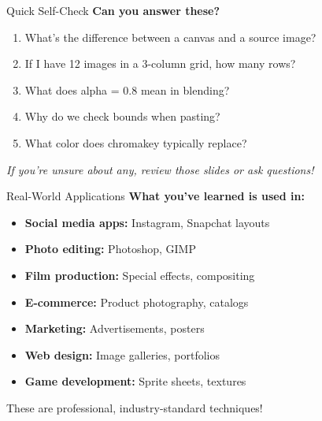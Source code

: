 \documentclass{csbeamer}
\begin{document}
\begin{frame}{Quick Self-Check}
    \textbf{Can you answer these?}

    \vspace{1em}

    \begin{enumerate}
        \item What's the difference between a canvas and a source image?
        \item If I have 12 images in a 3-column grid, how many rows?
        \item What does alpha = 0.8 mean in blending?
        \item Why do we check bounds when pasting?
        \item What color does chromakey typically replace?
    \end{enumerate}

    \vspace{1em}

    \pause

    \begin{center}
        \textit{If you're unsure about any, review those slides or ask questions!}
    \end{center}
\end{frame}

\begin{frame}{Real-World Applications}
    \textbf{What you've learned is used in:}

    \vspace{1em}

    \begin{itemize}
        \item \textbf{Social media apps:} Instagram, Snapchat layouts
        \item \textbf{Photo editing:} Photoshop, GIMP
        \item \textbf{Film production:} Special effects, compositing
        \item \textbf{E-commerce:} Product photography, catalogs
        \item \textbf{Marketing:} Advertisements, posters
        \item \textbf{Web design:} Image galleries, portfolios
        \item \textbf{Game development:} Sprite sheets, textures
    \end{itemize}

    \vspace{1em}

    \begin{center}
        These are professional, industry-standard techniques!
    \end{center}
\end{frame}
\end{document}
